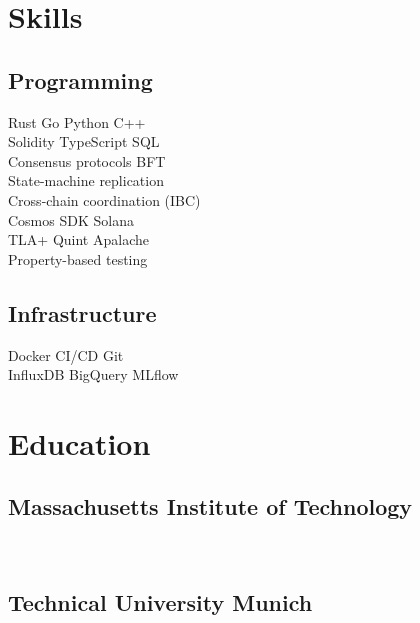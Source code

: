 \documentclass[]{plushcv}
\begin{document}
\begin{minipage}[t]{0.25\textwidth} 


\section{Skills}
\subsection{Programming}
\sectionsep
{}
Rust \textbullet{} Go \textbullet{} Python \textbullet{} C++ \\
Solidity \textbullet{} TypeScript \textbullet{} SQL \\
\sectionsep
{}
Consensus protocols \textbullet{} BFT \\
State-machine replication \\
Cross-chain coordination (IBC) \\
Cosmos SDK \textbullet{} Solana \\
\sectionsep
{}
TLA+ \textbullet{} Quint \textbullet{} Apalache \\
Property-based testing \\
\sectionsep
\subsection{Infrastructure}
\sectionsep
Docker \textbullet{} CI/CD \textbullet{} Git \\
InfluxDB \textbullet{} BigQuery \textbullet{} MLflow \\
\sectionsep


\section{Education} 
\subsection{Massachusetts Institute of Technology}
 \\

\sectionsep
\subsection{Technical University Munich}
\\
\sectionsep


\end{minipage}
\end{document}
